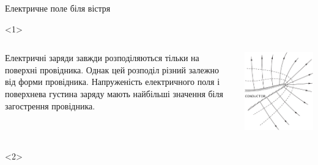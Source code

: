 \documentclass[onlytextwidth]{beamer}
\begin{document}
\begin{frame}{Електричне поле біля вістря}{}
	\begin{onlyenv}
		\begin{columns}
			\begin{column}{0.6\linewidth}
				\begin{block}{}\justifying
					Електричні заряди завжди розподіляються тільки на поверхні провідника. Однак цей
					розподіл різний залежно від форми провідника. \alert{Напруженість електричного поля
						і поверхнева густина заряду мають найбільші значення біля загострення
						провідника}.
				\end{block}
			\end{column}
			\begin{column}{0.39\linewidth}\centering
				\includegraphics[width=\linewidth]{tip.pdf}
			\end{column}
		\end{columns}
	\end{onlyenv}
	\begin{onlyenv}
		\begin{block}{}\justifying

\end{block}
\end{onlyenv}
\end{frame}
\end{document}
